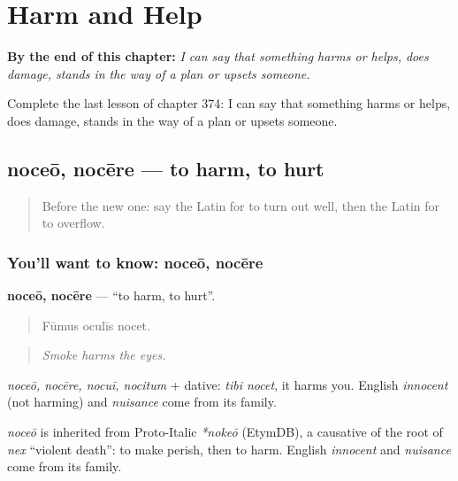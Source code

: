 
\chapter{Harm and Help}
\label{ch:la-harm-and-help}

\begin{chapteropening}
\textbf{By the end of this chapter:} \emph{I can say that something harms or helps, does damage, stands in the way of a plan or upsets someone.}

Complete the last lesson of chapter 374: I can say that something harms or helps, does damage, stands in the way of a plan or upsets someone.
\end{chapteropening}

\section[noceō, nocēre]{noceō, nocēre — to harm, to hurt}

\label{lesson:LA-C374-noceo}



\begin{quote}
Before the new one: say the Latin for to turn out well, then the Latin for to overflow.
\end{quote}

\subsection*{You'll want to know: noceō, nocēre}
\textbf{noceō, nocēre} — \textquotedblleft{}to harm, to hurt\textquotedblright{}.

\begin{quote}
Fūmus oculīs nocet.
\end{quote}

\begin{quote}
\emph{Smoke harms the eyes.}
\end{quote}

\emph{noceō, nocēre, nocuī, nocitum} + dative: \emph{tibi nocet}, it harms you. English \emph{innocent} (not harming) and \emph{nuisance} come from its family.

\begin{cousinweb}
\emph{noceō} is inherited from Proto-Italic \emph{*nokeō} (EtymDB), a causative of the root of \emph{nex} \textquotedblleft{}violent death\textquotedblright{}: to make perish, then to harm. English \emph{innocent} and \emph{nuisance} come from its family.
\end{cousinweb}

